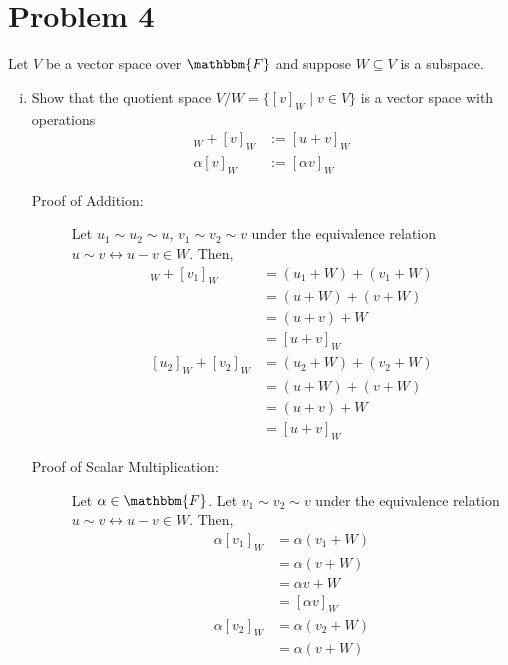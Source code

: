\documentclass[10pt]{extarticle}
\begin{document}
  \section{Problem 4}%
    Let $V$ be a vector space over $\mathbbm{F}$ and suppose $W\subseteq V$ is a subspace.
    \begin{enumerate}[(i)]
      \item Show that the quotient space $V/W = \{[v]_W\mid v\in V\}$ is a vector space with operations
        \begin{align*}
          [u]_W + [v]_W &:=[u+v]_W\\
          \alpha[v]_W &:= [\alpha v]_W
        \end{align*}
        \begin{description}
          \item[Proof of Addition:] Let $u_1\sim u_2 \sim u$, $v_1 \sim v_2 \sim v$ under the equivalence relation $u\sim v \leftrightarrow u-v\in W$. Then,
            \begin{align*}
              [u_1]_W + [v_1]_W &= (u_1 + W) + (v_1 + W)\\
                                &= (u+W) + (v+W)\\
                                &= (u+v) + W\\
                                &= [u+v]_W\\
              [u_2]_W + [v_2]_W &= (u_2 + W) + (v_2 + W)\\
                                &= (u + W) + (v + W)\\
                                &= (u+v)+W\\
                                &= [u+v]_W
            \end{align*}
          \item[Proof of Scalar Multiplication:] Let $\alpha \in \mathbbm{F}$. Let $v_1\sim v_2 \sim v$ under the equivalence relation $u\sim v \leftrightarrow u-v\in W$. Then,
            \begin{align*}
              \alpha[v_1]_W &= \alpha \left(v_1 + W\right)\\
                            &= \alpha(v + W)\\
                            &= \alpha v + W\\
                            &= [\alpha v]_W\\
              \alpha[v_2]_W &= \alpha \left(v_2 + W\right)\\
                            &= \alpha \left(v + W\right)\\

\end{align*}
\end{description}
\end{enumerate}
\end{document}
